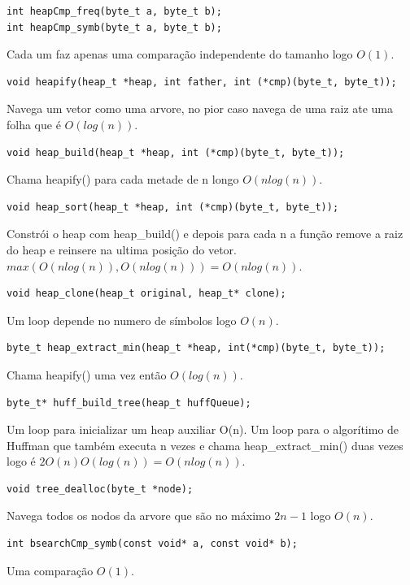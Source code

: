 \documentclass[a4paper, 11pt]{article}
\begin{document}
\begin{verbatim}
int heapCmp_freq(byte_t a, byte_t b);
int heapCmp_symb(byte_t a, byte_t b);
\end{verbatim} 
Cada um faz apenas uma comparação independente do tamanho logo $O(1)$.

\begin{verbatim}
void heapify(heap_t *heap, int father, int (*cmp)(byte_t, byte_t));
\end{verbatim} 
Navega um vetor como uma arvore, no pior caso navega de uma raiz ate uma folha que é $O(log(n))$.

\begin{verbatim}
void heap_build(heap_t *heap, int (*cmp)(byte_t, byte_t));
\end{verbatim} 
Chama heapify() para cada metade de n longo $O(nlog(n))$.

\begin{verbatim}
void heap_sort(heap_t *heap, int (*cmp)(byte_t, byte_t));
\end{verbatim} 
Constrói o heap com heap\_build() e depois para cada n a função remove a raiz do heap e reinsere na ultima posição do vetor. $max(O(nlog(n)), O(nlog(n))) = O(nlog(n))$.

\begin{verbatim}
void heap_clone(heap_t original, heap_t* clone);
\end{verbatim} 
Um loop depende no numero de símbolos logo $O(n)$.

\begin{verbatim}
byte_t heap_extract_min(heap_t *heap, int(*cmp)(byte_t, byte_t));
\end{verbatim} 
Chama heapify() uma vez então $O(log(n))$.

\begin{verbatim}
byte_t* huff_build_tree(heap_t huffQueue);
\end{verbatim} 
Um loop para inicializar um heap auxiliar O(n). Um loop para o algorítimo de Huffman que também executa n vezes e chama heap\_extract\_min() duas vezes logo é $2O(n)O(log(n)) = O(nlog(n))$.

\begin{verbatim}
void tree_dealloc(byte_t *node);
\end{verbatim} 
Navega todos os nodos da arvore que são no máximo $2n - 1$ logo $O(n)$.

\begin{verbatim}
int bsearchCmp_symb(const void* a, const void* b);
\end{verbatim} 
Uma comparação $O(1)$.
\end{document}
